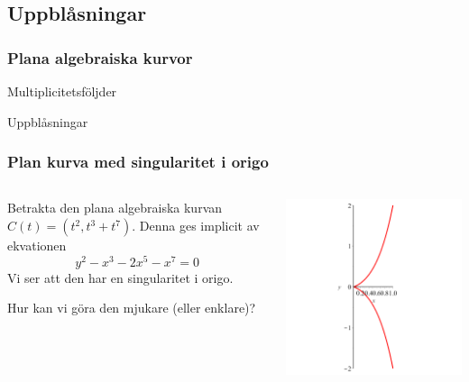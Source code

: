 \documentclass{beamer}
\begin{document}
\subsection{Uppblåsningar}

\begin{frame}
	\frametitle{Plana algebraiska kurvor}
	\begin{center}
		\Large Multiplicitetsföljder
		
		Uppblåsningar
	\end{center}
\end{frame}

\begin{frame}
	\frametitle{Plan kurva med singularitet i origo}
	\begin{columns}[onlytextwidth]
		\begin{column}{0.5\textwidth}
			Betrakta den plana algebraiska kurvan $C(t)=(t^2,t^3+t^7)$. Denna ges implicit av ekvationen
			\[y^2-x^3-2x^5-x^7 = 0\]
			Vi ser att den har en singularitet i origo.
			
			\vspace{20pt}
			Hur kan vi göra den mjukare (eller enklare)?
		\end{column}
		\begin{column}{0.5\textwidth}
			\begin{center}
				\includegraphics[scale=0.35]{Export/blowupex1_1.png}
			\end{center}
		\end{column}
	\end{columns}	
\end{frame}
\end{document}
